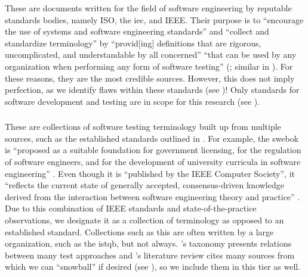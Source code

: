 These are documents written for the field of software engineering by reputable
standards bodies, namely ISO, the \acf{iec}, and IEEE. Their purpose is to
``encourage the use of systems and software engineering standards'' and
``collect and standardize terminology'' by ``provid[ing] definitions that are
rigorous, uncomplicated, and understandable by all concerned''
\citep[p.~viii]{IEEE2017} ``that can be used by any organization when
performing any form of software testing''
\ifnotpaper(\fi\citeyear[p.~vii]{IEEE2022}\ifnotpaper; similar in
\citeyear[p.~ix]{IEEE2016})\fi. For these reasons, they
are the most credible sources. However, this does not imply perfection, as we
identify  %
flaws within these standards (see )!
Only standards for software development and testing are in scope for
this research (see ).

\subsubsection{}\label{metas}

These are collections of software testing terminology built up from multiple
sources, such as the established standards outlined in . For
example, the \acs{swebok} is ``proposed as a
suitable foundation for government licensing, for the regulation of software
engineers, and for the development of university curricula in software
engineering'' \citep[p.~xix]{KanerEtAl2011}. Even though it is ``published by
the IEEE Computer Society'', it ``reflects the current state of generally
accepted, consensus-driven knowledge derived from the interaction between
software engineering theory and practice'' \citep{AboutSWEBOK}. Due to this
combination of IEEE standards and state-of-the-practice observations, we
designate it as a collection of terminology as opposed to an established
standard. Collections such as this are often written by a large
organization, such as the \acf{istqb}, but not always. \ifnotpaper \else
    \citeauthor{Firesmith2015} \fi \citet{Firesmith2015}'s taxonomy presents
relations between many test approaches and \ifnotpaper \else
    \citeauthor{DoğanEtAl2014} \fi \citet{DoğanEtAl2014}'s literature
review cites many sources from which we can ``snowball'' if desired
(see ), so we include them in this tier as well.

